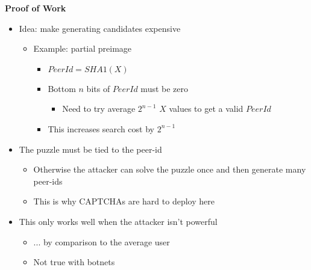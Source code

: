 \documentclass[helvetica]{seminar}
\newcommand{\heading}[1]{%
  \begin{center} 
    \large\bf 
    #1 
  \end{center} 
  \vspace{.4 in}}
\begin{document}
\begin{slide}
\heading{Proof of Work}

\vspace{-.3 in}
\begin{itemize}
\item Idea: make generating candidates expensive
\begin{itemize}
\item Example: partial preimage
\begin{itemize}
\item $PeerId = SHA1(X)$
\item Bottom $n$ bits of $PeerId$ must be zero
\begin{itemize}
\item Need to try average $2^{n-1}$ $X$ values to get a valid $PeerId$
\end{itemize}
\item This increases search cost by $2^{n-1}$
\end{itemize}
\end{itemize}
\item The puzzle must be tied to the peer-id
\begin{itemize}
\item Otherwise the attacker can solve the puzzle once and then generate many peer-ids
\item This is why CAPTCHAs are hard to deploy here
\end{itemize}
\item This only works well when the attacker isn't powerful
\begin{itemize}
\item ... by comparison to the average user
\item Not true with botnets
\end{itemize}
\end{itemize}
\end{slide}
\end{document}
